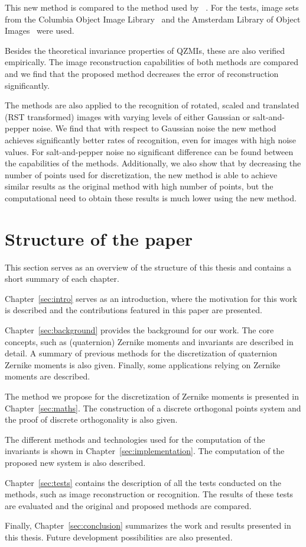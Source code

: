 This new method is compared to the method used by \citeauthor{qzmi}~\cite{qzmi}. For the tests, image sets from the Columbia Object Image Library~\cite{coil} and the Amsterdam Library of Object Images~\cite{aloi} were used. 

Besides the theoretical invariance properties of QZMIs, these are also verified empirically. The image reconstruction capabilities of both methods are compared and we find that the proposed method decreases the error of reconstruction significantly.

The methods are also applied to the recognition of rotated, scaled and translated (RST transformed) images with varying levels of either Gaussian or salt-and-pepper noise. We find that with respect to Gaussian noise the new method achieves significantly better rates of recognition, even for images with high noise values. For salt-and-pepper noise no significant difference can be found between the capabilities of the methods.
Additionally, we also show that by decreasing the number of points used for discretization, the new method is able to achieve similar results as the original method with high number of points, but the computational need to obtain these results is much lower using the new method.


\section{Structure of the paper}
This section serves as an overview of the structure of this thesis and contains a short summary of each chapter.

Chapter~\ref{sec:intro} serves as an introduction, where the motivation for this work is described and the contributions featured in this paper are presented.

Chapter~\ref{sec:background} provides the background for our work. The core concepts, such as (quaternion) Zernike moments and invariants are described in detail. A summary of previous methods for the discretization of quaternion Zernike moments is also given. Finally, some applications relying on Zernike moments are described.

The method we propose for the discretization of Zernike moments is presented in Chapter~\ref{sec:maths}. The construction of a discrete orthogonal points system and the proof of discrete orthogonality is also given.

The different methods and technologies used for the computation of the invariants is shown in Chapter~\ref{sec:implementation}. The computation of the proposed new system is also described.

Chapter~\ref{sec:tests} contains the description of all the tests conducted on the methods, such as image reconstruction or recognition. The results of these tests are evaluated and the original and proposed methods are compared.

Finally, Chapter~\ref{sec:conclusion} summarizes the work and results presented in this thesis. Future development possibilities are also presented. 